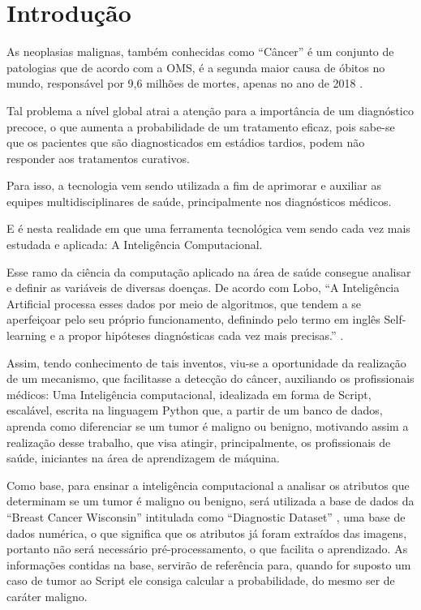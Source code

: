 \chapter{Introdução}
\label{chapter:introducao}

As neoplasias malignas, também conhecidas como “Câncer” é um conjunto de patologias que
de acordo com a OMS, é a segunda maior causa de óbitos no mundo,
responsável por 9,6 milhões de mortes, apenas no ano de 2018 \cite{ESTATISTICACANCER}.

Tal problema a nível global atrai a atenção para a importância de um diagnóstico precoce,
o que aumenta a probabilidade de um tratamento eficaz, pois sabe-se que os pacientes que são diagnosticados em estádios tardios,
podem não responder aos tratamentos curativos.

Para isso, a tecnologia vem sendo utilizada a fim de aprimorar e auxiliar as equipes multidisciplinares de saúde,
principalmente nos diagnósticos médicos.

E é nesta realidade em que uma ferramenta tecnológica vem sendo cada vez mais estudada e aplicada:
A Inteligência Computacional.

Esse ramo da ciência da computação aplicado na área de saúde consegue analisar e definir as variáveis de diversas doenças.
De acordo com  Lobo, “A Inteligência Artificial processa esses dados por meio de algoritmos,
que tendem a se aperfeiçoar pelo seu próprio funcionamento,
definindo pelo termo em inglês Self-learning e a propor hipóteses diagnósticas cada vez mais precisas.”
\cite{IAEMSAUDE}.

Assim, tendo conhecimento de tais inventos, viu-se a oportunidade da realização de um mecanismo,
que facilitasse a detecção do câncer, auxiliando os profissionais médicos:
Uma Inteligência computacional, idealizada em forma de Script, escalável, escrita na linguagem Python que,
a partir de um banco de dados, aprenda como diferenciar se um tumor é maligno ou benigno,
motivando assim a realização desse trabalho, que visa atingir, principalmente, os profissionais de saúde,
iniciantes na área de aprendizagem de máquina.

Como base, para ensinar a inteligência computacional a analisar os atributos que determinam se um tumor é maligno ou benigno,
será utilizada a base de dados da “Breast Cancer Wisconsin” intitulada como “Diagnostic Dataset” \cite{BREASTCANCER},
uma base de dados numérica, o que significa que os atributos já foram extraídos das imagens, portanto não será necessário pré-processamento,
o que facilita o aprendizado.
As informações contidas na base,
servirão de referência para, quando for suposto um caso de tumor ao Script ele consiga calcular a probabilidade,
do mesmo ser de caráter maligno.

